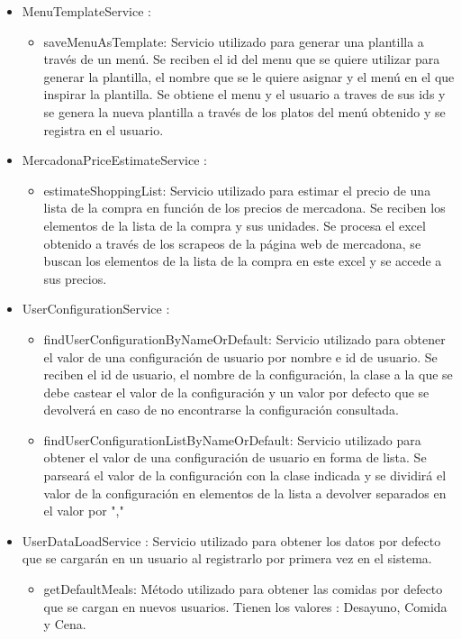 \documentclass[12pt, a4paper, twoside]{book}
\begin{document}
\begin{itemize}
\begin{itemize}
		\end{itemize}
		\item MenuTemplateService :
		\begin{itemize}
			\item saveMenuAsTemplate: Servicio utilizado para generar una plantilla a través de un menú. Se reciben el id del menu que se quiere utilizar para generar la plantilla, el nombre que se le quiere asignar y el menú en el que inspirar la plantilla. Se obtiene el menu y el usuario a traves de sus ids y se genera la nueva plantilla a través de los platos del menú obtenido y se registra en el usuario.
		\end{itemize}
		\item MercadonaPriceEstimateService : 
		\begin{itemize}
			\item estimateShoppingList: Servicio utilizado para estimar el precio de una lista de la compra en función de los precios de mercadona. Se reciben los elementos de la lista de la compra y sus unidades. Se procesa el excel obtenido a través de los scrapeos de la página web de mercadona, se buscan los elementos de la lista de la compra en este excel y se accede a sus precios.
		\end{itemize}
		\item UserConfigurationService :
		\begin{itemize}
			\item findUserConfigurationByNameOrDefault: Servicio utilizado para obtener el valor de una configuración de usuario por nombre e id de usuario. Se reciben el id de usuario, el nombre de la configuración, la clase a la que se debe castear el valor de la configuración y un valor por defecto que se devolverá en caso de no encontrarse la configuración consultada.
			\item findUserConfigurationListByNameOrDefault: Servicio utilizado para obtener el valor de una configuración de usuario en forma de lista. Se parseará el valor de la configuración con la clase indicada y se dividirá el valor de la configuración en elementos de la lista a devolver separados en el valor por ","
		\end{itemize}
		\item UserDataLoadService : Servicio utilizado para obtener los datos por defecto que se cargarán en un usuario al registrarlo por primera vez en el sistema.
		\begin{itemize}
			\item getDefaultMeals: Método utilizado para obtener las comidas por defecto que se cargan en nuevos usuarios. Tienen los valores : Desayuno, Comida y Cena.

\end{itemize}
\end{itemize}
\end{document}

